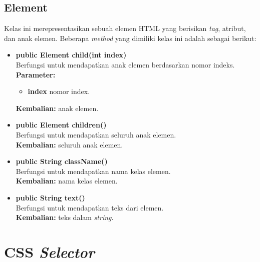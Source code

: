 \subsection{Element}

Kelas ini merepresentasikan sebuah elemen HTML yang berisikan \textit{tag}, atribut, dan anak elemen. Beberapa \textit{method} yang dimiliki kelas ini adalah sebagai berikut:
\begin{itemize}
	\item \textbf{public Element child(int index)} \\
		Berfungsi untuk mendapatkan anak elemen berdasarkan nomor indeks. \\
		\textbf{Parameter:} 
		\begin{itemize}
			\item \textbf{index} nomor index.
		\end{itemize}
		\textbf{Kembalian:} anak elemen.	
		
		\item \textbf{public Element children()} \\
		Berfungsi untuk mendapatkan seluruh anak elemen. \\
		\textbf{Kembalian:} seluruh anak elemen.	
		
		\item \textbf{public String className()} \\
		Berfungsi untuk mendapatkan nama kelas elemen. \\
		\textbf{Kembalian:} nama kelas elemen.	
		
		\item \textbf{public String text()} \\
		Berfungsi untuk mendapatkan teks dari elemen. \\
		\textbf{Kembalian:} teks dalam \textit{string}.	
\end{itemize}

\section{CSS \textit{Selector}}
\label{sec:selector}

